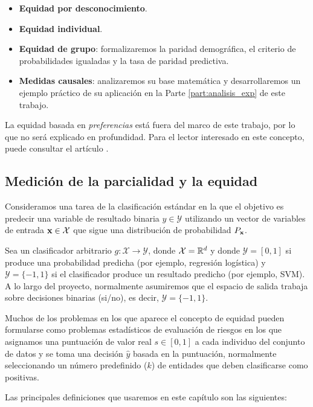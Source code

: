 \documentclass[oneside,openright,titlepage,numbers=noenddot,openany,headinclude,footinclude=true,
cleardoublepage=empty,abstractoff,BCOR=5mm,paper=a4,fontsize=12pt,main=spanish]{scrreprt}
\begin{document}
\begin{itemize}
    \item \textbf{Equidad por desconocimiento}.
    \item \textbf{Equidad individual}.
    \item \textbf{Equidad de grupo}: formalizaremos la paridad demográfica, el criterio de probabilidades igualadas y la tasa de paridad predictiva.
    \item \textbf{Medidas causales}: analizaremos su base matemática y desarrollaremos un ejemplo práctico de su aplicación en la Parte \ref{part:analisis_exp} de este trabajo.
\end{itemize}

La equidad basada en \textit{preferencias} está fuera del marco de este trabajo, por lo que no será explicado en profundidad. Para el lector interesado en este concepto, puede consultar el artículo \cite{preferences2017}.

\subsection{Medición de la parcialidad y la equidad}

Consideramos una tarea de la clasificación estándar en la que el objetivo es predecir una variable de resultado binaria $y \in \mathcal{Y}$ utilizando un vector de variables de entrada $\textbf{x} \in \mathcal{X}$ que sigue una distribución de probabilidad $P_{\textbf{x}}$.

Sea un clasificador arbitrario $g:\mathcal{X} \rightarrow \mathcal{Y}$, donde $\mathcal{X}=\mathbb{R}^d$ y donde $\mathcal{Y}=[0,1]$ si produce una probabilidad predicha (por ejemplo, regresión logística) y $\mathcal{Y}=\{-1,1\}$ si el clasificador produce un resultado predicho (por ejemplo, SVM). A lo largo del proyecto, normalmente asumiremos que el espacio de salida trabaja sobre decisiones binarias (si/no), es decir, $\mathcal{Y}=\{-1,1\}$.

Muchos de los problemas en los que aparece el concepto de equidad pueden formularse como problemas estadísticos de evaluación de riesgos en los que asignamos una puntuación de valor real $s \in [0,1]$ a cada individuo del conjunto de datos y se toma una decisión $\hat{y}$
basada en la puntuación, normalmente seleccionando un número predefinido ($k$) de
entidades que deben clasificarse como positivas.

Las principales definiciones que usaremos en este capítulo son las siguientes:
\end{document}
